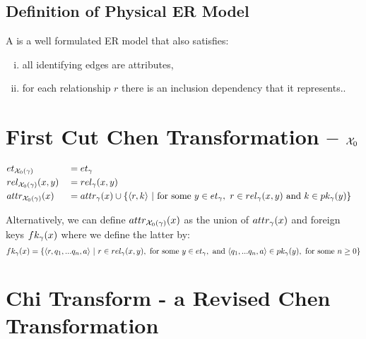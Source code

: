 \subsection{Definition of Physical ER Model}
\begin{definition}
\noindent 
A  is a well formulated ER model that also satisfies:
\begin{enumerate}[(i)]
\item
all identifying edges are attributes, 

\item
for each relationship $r$ there is  an inclusion dependency that it represents..
\end{enumerate} 
\end{definition}


\section{First Cut Chen Transformation -- $\chiZero$}

\begin{align}
&\et[\chiZeroM]        && = \et        && \\
&\rel[\chiZeroM]{x}{y} && = \rel{x}{y}  &&\\
&\attr[\chiZeroM]{x}   && = \attr{x}  \cup  \setsuchthat{\tuple{r,k}}{\text{for some }
			                  y \in \et, \ r \in \rel{x}{y} \text{ and } k \in \pk{y}} 
\end{align}

Alternatively, we can define $\attr[\chiZeroM]{x}$ as the union of $\attr{x}$ and foreign keys $\fk{x}$
where we define the latter by:
\begin{equation}
\fk{x} = \setsuchthat{\tuple{r,q_1,...q_n,a}}
                               {r \in \rel{x}{y},
                                  \text{ for some } y \in \et,
																	\text{ and } \tuple{q_1,...q_n,a} \in \pk{y},
																	\text{ for some } n \geq 0
			                   }
\end{equation}

\section{Chi Transform - a Revised Chen Transformation}

